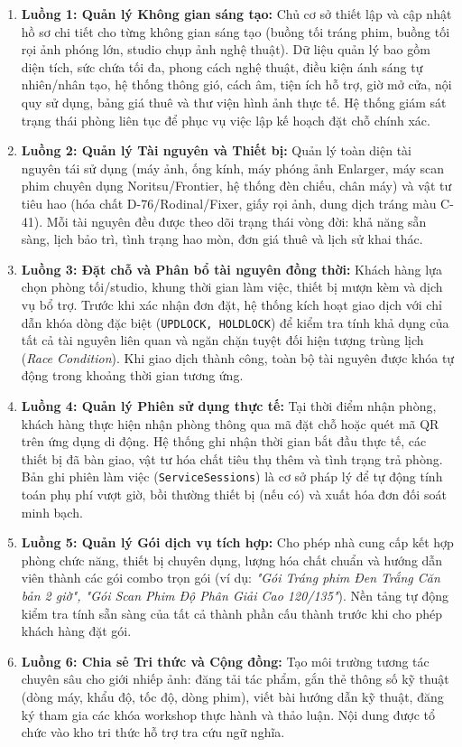 \begin{enumerate}[leftmargin=2em]
    \item \textbf{Luồng 1: Quản lý Không gian sáng tạo:}
    Chủ cơ sở thiết lập và cập nhật hồ sơ chi tiết cho từng không gian sáng tạo (buồng tối tráng phim, buồng tối rọi ảnh phóng lớn, studio chụp ảnh nghệ thuật). Dữ liệu quản lý bao gồm diện tích, sức chứa tối đa, phong cách nghệ thuật, điều kiện ánh sáng tự nhiên/nhân tạo, hệ thống thông gió, cách âm, tiện ích hỗ trợ, giờ mở cửa, nội quy sử dụng, bảng giá thuê và thư viện hình ảnh thực tế. Hệ thống giám sát trạng thái phòng liên tục để phục vụ việc lập kế hoạch đặt chỗ chính xác.

    \item \textbf{Luồng 2: Quản lý Tài nguyên và Thiết bị:}
    Quản lý toàn diện tài nguyên tái sử dụng (máy ảnh, ống kính, máy phóng ảnh Enlarger, máy scan phim chuyên dụng Noritsu/Frontier, hệ thống đèn chiếu, chân máy) và vật tư tiêu hao (hóa chất D-76/Rodinal/Fixer, giấy rọi ảnh, dung dịch tráng màu C-41). Mỗi tài nguyên đều được theo dõi trạng thái vòng đời: khả năng sẵn sàng, lịch bảo trì, tình trạng hao mòn, đơn giá thuê và lịch sử khai thác.

    \item \textbf{Luồng 3: Đặt chỗ và Phân bổ tài nguyên đồng thời:}
    Khách hàng lựa chọn phòng tối/studio, khung thời gian làm việc, thiết bị mượn kèm và dịch vụ bổ trợ. Trước khi xác nhận đơn đặt, hệ thống kích hoạt giao dịch với chỉ dẫn khóa dòng đặc biệt (\texttt{UPDLOCK, HOLDLOCK}) để kiểm tra tính khả dụng của tất cả tài nguyên liên quan và ngăn chặn tuyệt đối hiện tượng trùng lịch (\textit{Race Condition}). Khi giao dịch thành công, toàn bộ tài nguyên được khóa tự động trong khoảng thời gian tương ứng.

    \item \textbf{Luồng 4: Quản lý Phiên sử dụng thực tế:}
    Tại thời điểm nhận phòng, khách hàng thực hiện nhận phòng thông qua mã đặt chỗ hoặc quét mã QR trên ứng dụng di động. Hệ thống ghi nhận thời gian bắt đầu thực tế, các thiết bị đã bàn giao, vật tư hóa chất tiêu thụ thêm và tình trạng trả phòng. Bản ghi phiên làm việc (\texttt{ServiceSessions}) là cơ sở pháp lý để tự động tính toán phụ phí vượt giờ, bồi thường thiết bị (nếu có) và xuất hóa đơn đối soát minh bạch.

    \item \textbf{Luồng 5: Quản lý Gói dịch vụ tích hợp:}
    Cho phép nhà cung cấp kết hợp phòng chức năng, thiết bị chuyên dụng, lượng hóa chất chuẩn và hướng dẫn viên thành các gói combo trọn gói (ví dụ: \textit{"Gói Tráng phim Đen Trắng Căn bản 2 giờ", "Gói Scan Phim Độ Phân Giải Cao 120/135"}). Nền tảng tự động kiểm tra tính sẵn sàng của tất cả thành phần cấu thành trước khi cho phép khách hàng đặt gói.

    \item \textbf{Luồng 6: Chia sẻ Tri thức và Cộng đồng:}
    Tạo môi trường tương tác chuyên sâu cho giới nhiếp ảnh: đăng tải tác phẩm, gắn thẻ thông số kỹ thuật (dòng máy, khẩu độ, tốc độ, dòng phim), viết bài hướng dẫn kỹ thuật, đăng ký tham gia các khóa workshop thực hành và thảo luận. Nội dung được tổ chức vào kho tri thức hỗ trợ tra cứu ngữ nghĩa.
\end{enumerate}


